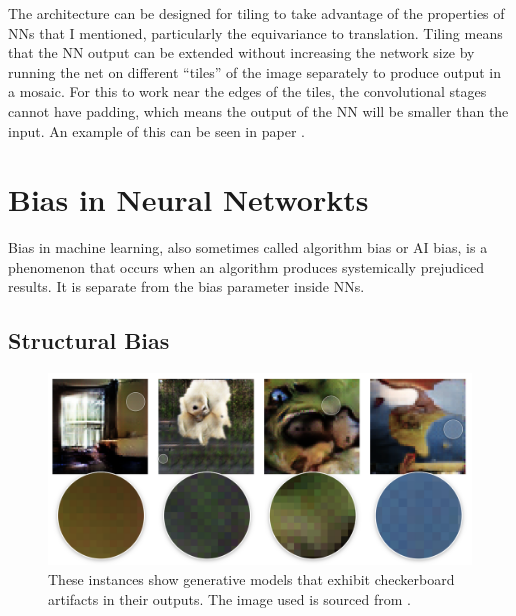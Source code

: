 The architecture can be designed for tiling to take advantage of the properties of \glspl{NN} that I mentioned, particularly the equivariance to translation. Tiling means that the \gls{NN} output can be extended without increasing the network size by running the net on different ``tiles'' of the image separately to produce output in a mosaic. For this to work near the edges of the tiles, the convolutional stages cannot have padding, which means the output of the \gls{NN} will be smaller than the input. An example of this can be seen in paper \cite[fig. 2]{unet}.

\section{Bias in Neural Networkts}
\label{sec:bias}

Bias in machine learning, also sometimes called algorithm bias or AI bias, is a phenomenon that occurs when an algorithm produces systemically prejudiced results. It is separate from the bias parameter inside \glspl{NN}.

\subsection{Structural Bias}
\label{subsec:structural_bias}

\begin{figure}[ht]
    \centering
    \includegraphics[width=\textwidth]{images/checkerboard_artefacts_models.png}
    \caption[Grid patterns in generative models]{\label{fig:grid_patterns_in_models}These instances show generative models that exhibit checkerboard artifacts in their outputs. The image used is sourced from \cite{deconvolutionbias}.}
\end{figure}


